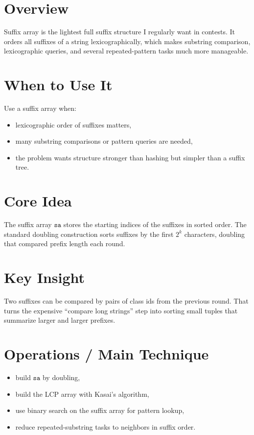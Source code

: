\section*{Overview}

Suffix array is the lightest full suffix structure I regularly want in contests. It orders all suffixes of a string
lexicographically, which makes substring comparison, lexicographic queries, and several repeated-pattern tasks much more
manageable.

\section*{When to Use It}

Use a suffix array when:

\begin{itemize}
  \item lexicographic order of suffixes matters,
  \item many substring comparisons or pattern queries are needed,
  \item the problem wants structure stronger than hashing but simpler than a suffix tree.
\end{itemize}

\section*{Core Idea}

The suffix array \(\texttt{sa}\) stores the starting indices of the suffixes in sorted order. The standard doubling
construction sorts suffixes by the first \(2^k\) characters, doubling that compared prefix length each round.

\section*{Key Insight}

Two suffixes can be compared by pairs of class ids from the previous round. That turns the expensive ``compare long
strings'' step into sorting small tuples that summarize larger and larger prefixes.

\section*{Operations / Main Technique}

\begin{itemize}
  \item build \(\texttt{sa}\) by doubling,
  \item build the LCP array with Kasai's algorithm,
  \item use binary search on the suffix array for pattern lookup,
  \item reduce repeated-substring tasks to neighbors in suffix order.
\end{itemize}

